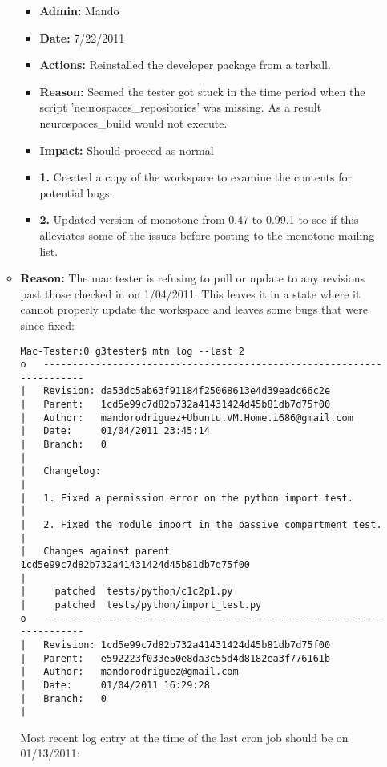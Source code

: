 \documentclass[12pt]{article}
\begin{document}
\begin{itemize}
\begin{itemize}
\begin{itemize}
\item[] {\bf Admin:} Mando
\item[] {\bf Date:} 7/22/2011
\item[] {\bf Actions:} Reinstalled the developer package from a tarball.
\item[] {\bf Reason:}  Seemed the tester got stuck in the time period when the script 'neurospaces\_repositories' was missing. As a result neurospaces\_build would not execute.
\item[] {\bf Impact:}  Should proceed as normal
\end{itemize}


\begin{itemize}
\item[] {\bf 1.} Created a copy of the workspace to examine the contents for potential bugs. 
\item[] {\bf 2.} Updated version of monotone from 0.47 to 0.99.1 to see if this alleviates some of the issues before posting to the monotone mailing list.
\end{itemize}

\item[] {\bf Reason:}  The mac tester is refusing to pull or update to any revisions past those checked in on 1/04/2011. This leaves it in a state where it cannot properly update the workspace and leaves some bugs that were since fixed:

\begin{verbatim}
Mac-Tester:0 g3tester$ mtn log --last 2
o   ----------------------------------------------------------------------
|   Revision: da53dc5ab63f91184f25068613e4d39eadc66c2e
|   Parent:   1cd5e99c7d82b732a41431424d45b81db7d75f00
|   Author:   mandorodriguez+Ubuntu.VM.Home.i686@gmail.com
|   Date:     01/04/2011 23:45:14
|   Branch:   0
|   
|   Changelog: 
|   
|   1. Fixed a permission error on the python import test.
|   
|   2. Fixed the module import in the passive compartment test.
|   
|   Changes against parent 1cd5e99c7d82b732a41431424d45b81db7d75f00
|   
|     patched  tests/python/c1c2p1.py
|     patched  tests/python/import_test.py
o   ----------------------------------------------------------------------
|   Revision: 1cd5e99c7d82b732a41431424d45b81db7d75f00
|   Parent:   e592223f033e50e8da3c55d4d8182ea3f776161b
|   Author:   mandorodriguez@gmail.com
|   Date:     01/04/2011 16:29:28
|   Branch:   0
|   
\end{verbatim}

Most recent log entry at the time of the last cron job should be on 01/13/2011:


\end{itemize}
\end{itemize}
\end{document}
